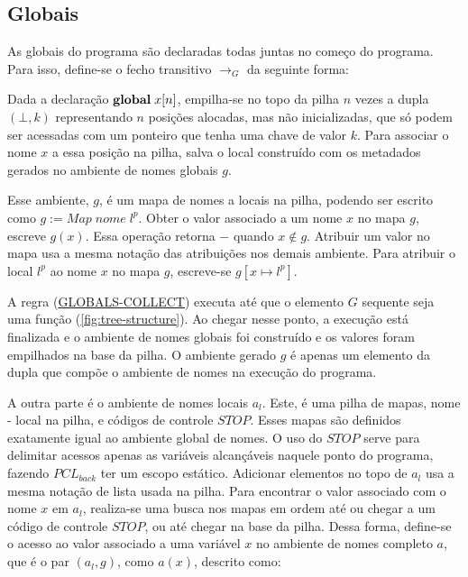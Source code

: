 \subsection{Globais}

As globais do programa são declaradas todas juntas no começo do programa. Para isso, define-se o fecho transitivo $\to_G$ da seguinte forma:


\noindent Dada a declaração $\mathbf{global}\;x[n]$, empilha-se no topo da pilha $n$ vezes a dupla $(\bot, k)$ representando $n$ posições alocadas, mas não inicializadas, que só podem ser acessadas com um ponteiro que tenha uma chave de valor $k$. Para associar o nome $x$ a essa posição na pilha, salva o local construído com os metadados gerados no ambiente de nomes globais $g$.

Esse ambiente, $g$, é um mapa de nomes a locais na pilha, podendo ser escrito como $g := Map\;nome\;l^p$. Obter o valor associado a um nome $x$ no mapa $g$, escreve $g(x)$. Essa operação  retorna $-$ quando $x \notin g$. Atribuir um valor no mapa usa a mesma notação das atribuições nos demais ambiente. Para atribuir o local $l^p$ ao nome $x$ no mapa $g$, escreve-se $g[x \mapsto l^p]$. 

A regra (\hyperref[rule:globals-collect]{GLOBALS-COLLECT}) executa até que o elemento $G$ sequente seja uma função (\ref{fig:tree-structure}). Ao chegar nesse ponto, a execução está finalizada e o ambiente de nomes globais foi construído e os valores foram empilhados na base da pilha. O ambiente gerado $g$ é apenas um elemento da dupla que compõe o ambiente de nomes na execução do programa. 

A outra parte é o ambiente de nomes locais $a_l$. Este, é uma pilha de mapas, nome - local na pilha, e códigos de controle $STOP$. Esses mapas são definidos exatamente igual ao ambiente global de nomes. O uso do $STOP$ serve para delimitar acessos apenas as variáveis alcançáveis naquele ponto do programa, fazendo $PCL_{back}$ ter um escopo estático. Adicionar elementos no topo de $a_l$ usa a mesma notação de lista usada na pilha. Para encontrar o valor associado com o nome $x$ em $a_l$, realiza-se uma busca nos mapas em ordem até ou chegar a um código de controle $STOP$, ou até chegar na base da pilha. Dessa forma, define-se o acesso ao valor associado a uma variável $x$ no ambiente de nomes completo $a$, que é o par $(a_l, g)$, como $a(x)$, descrito como:


